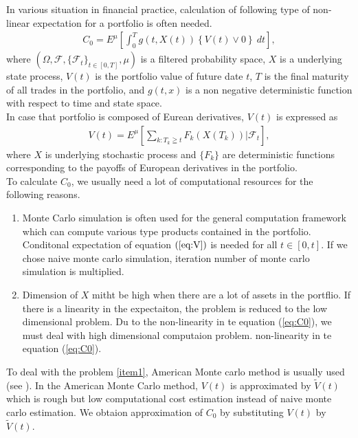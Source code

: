 \documentclass[12pt]{article}
\begin{document}
In various situation in financial practice, calculation of following type of non-linear expectation for a portfolio is often needed.
\begin{align}\label{eq:C0}
    C_0 = E^{\mu}\left[\int_{0}^T g(t, X(t))\left\{V(t) \vee0 \right \} \ dt \right],
\end{align}
where $(\Omega, \mathcal{F}, \{\mathcal{F}_t\}_{t\in [0,T]}, \mu)$ is a filtered probability space, $X$ is a underlying state process, $V(t)$ is the portfolio value of future date $t$, $T$ is the final maturity
of all trades in the portfolio, and $g(t, x)$ is a non negative deterministic function with respect to time and state space.\\
In case that portfolio is composed of Eurean derivatives, $V(t)$ is expressed as
\begin{align}\label{eq:V}
  V(t) =  E^{\mu} \left[ \sum_{k:T_k\geqq t}F_k\left({X}(T_k)\right) |\mathcal{F}_t \right],
\end{align}
where $X$ is underlying stochastic process and $\{F_k\}$ are deterministic functions corresponding to the payoffs of European derivatives in the portfolio.\\
To calculate $C_0$, we usually need a lot of computational resources for the following reasons.
\begin{enumerate}
    \item \label{item1} Monte Carlo simulation is often used for the general computation 
        framework which can compute various type products contained in the portfolio. 
        Conditonal expectation of equation $(\ref{eq:V})$ is needed for all $t \in [0, t]$.
        If we chose naive monte carlo simulation, iteration number of monte carlo 
        simulation is multiplied.
    \item \label{item2} 
        Dimension of $X$ mitht be high when there are a lot of assets in the portflio. 
        If there is a linearity in the expectaiton, the problem is reduced to the
        low dimensional problem. Du to the non-linearity in te equation (\ref{eq:C0}),
        we must deal with high dimensional computaion problem.
        non-linearity in te equation (\ref{eq:C0}).
\end{enumerate}
To deal with the problem \ref{item1}, American Monte carlo method is usually used (see \cite{G}).
In the American Monte Carlo method, $V(t)$ is approximated by $\tilde{V}(t)$ which is rough but low computational cost estimation instead of naive monte carlo estimation.
We obtaion approximation of $C_0$ by substituting $V(t)$ by $\tilde{V}(t)$.
\end{document}
